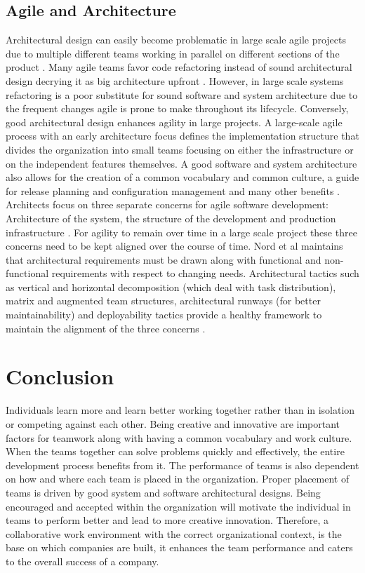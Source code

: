 \documentclass[sigplan,screen]{acmart}
\begin{document}
\subsection{Agile and Architecture}
Architectural design can easily become problematic in large scale agile projects due to multiple different teams working in parallel on different sections of the product \cite{Dingsoyr}. Many agile teams favor code refactoring instead of sound architectural design decrying it as big architecture upfront \cite{Nord}. However, in large scale systems refactoring is a poor substitute for sound software and system architecture due to the frequent changes agile is prone to make throughout its lifecycle. Conversely, good architectural design enhances agility in large projects. A large-scale agile process with an early architecture focus defines the implementation structure that divides the organization into small teams focusing on either the infrastructure or on the independent features themselves\cite{Nord}. A good software and system architecture also allows for the creation of a common vocabulary and common culture, a guide for release planning and configuration management and many other benefits \cite{Nord}.
Architects focus on three separate concerns for agile software development: Architecture of the system, the structure of the development and production infrastructure \cite{Dingsoyr}. For agility to remain over time in a large scale project these three concerns need to be kept aligned over the course of time. Nord et al maintains that architectural requirements must be drawn along with functional and non-functional requirements with respect to changing needs. Architectural tactics such as vertical and horizontal decomposition (which deal with task distribution), matrix and augmented team structures, architectural runways (for better maintainability) and deployability tactics provide a healthy framework to maintain the alignment of the three concerns \cite{Nord}. 
 
 \section{Conclusion}
 Individuals learn more and  learn better working together rather than in isolation or competing against each other. Being creative and innovative are important factors for teamwork along with having a common vocabulary and work culture. When the teams together can solve problems quickly and effectively, the entire development process benefits from it. The performance of teams is also dependent on how and where each team is placed in the organization. Proper placement of teams is driven by good system and software architectural designs. Being encouraged and accepted within the organization will motivate the individual in teams to perform better and lead to more creative innovation. Therefore, a collaborative work environment with the correct organizational context, is the base on which companies are built, it enhances the team performance and caters to the overall success of a company.



\end{document}
